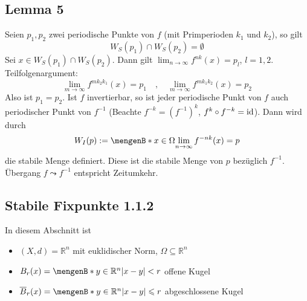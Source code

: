 \subsection{Lemma 5} %
\label{sub:lemma_5}
Seien $p_1, p_2$ zwei periodische Punkte von $f$ (mit Primperioden $k_1$ und $k_2$), so gilt
\[
	W_S(p_1) \cap W_S(p_2) =\emptyset
\]
Sei $x \in W_S(p_1) \cap W_S(p_2)$. Dann gilt $\lim_{n \to \infty}f^{nk}(x)=p_l $, $l=1,2$. Teilfolgenargument:
\[
	\lim_{m \to \infty} f^{m k_2 k_1}(x) =p_1 \quad , \quad \lim_{m \to \infty} f^{m k_1 k_2}(x)=p_2
\]
Also ist $p_1=p_2$. \bewende
{}
Ist $f$ invertierbar, so ist jeder periodische Punkt von $f$ auch periodischer Punkt von $f ^{-1}$ (Beachte $f^{-k}= (f ^{-1})^k$, $f^k \circ f^{-k}=\operatorname{id}$).
Dann wird durch
\[
	W_I(p) := \set[x \in \Omega]{\lim_{n \to \infty} f^{-nk}(x)=p} 
\]
die stabile Menge definiert. Diese ist die stabile Menge von $p$ bezüglich $f ^{-1}$.
Übergang $f \leadsto f ^{-1}$ entspricht Zeitumkehr.

\subsection{Stabile Fixpunkte 1.1.2} %
\label{sub:stabile_fixpunkte_1_1_2}
In diesem Abschnitt ist 
\begin{itemize}
	\item $(X,d)=\mathds{R}^n$ mit euklidischer Norm, $\Omega \subseteq \mathds{R}^n$
	\item $B_r(x)= \set[y \in \mathds{R}^n]{\abs*{x-y}<r } $ offene Kugel
	\item $\overline{B}_r(x) = \set[y \in \mathds{R}^n]{\abs*{x-y} \le r } $ abgeschlossene Kugel
\end{itemize}

